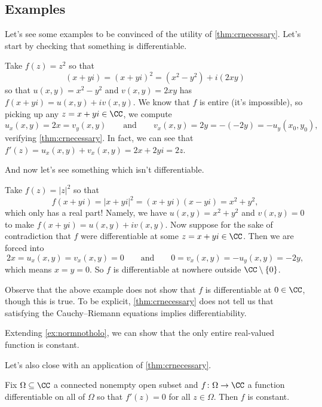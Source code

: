 \subsection{Examples}
Let's see some examples to be convinced of the utility of \autoref{thm:crnecessary}. Let's start by checking that something is differentiable.
\begin{example}
	Take $f(z)=z^2$ so that 
	\[(x+yi)=(x+yi)^2=\left(x^2-y^2\right)+i(2xy)\]
	so that $u(x,y)=x^2-y^2$ and $v(x,y)=2xy$ has $f(x+yi)=u(x,y)+iv(x,y)$. We know that $f$ is entire (it's impossible), so picking up any $z=x+yi\in\CC$, we compute
	\[u_x(x,y)=2x=v_y(x,y)\qquad\text{and}\qquad v_x(x,y)=2y=-(-2y)=-u_y(x_0,y_0),\]
	verifying \autoref{thm:crnecessary}. In fact, we can see that $f'(z)=u_x(x,y)+v_x(x,y)=2x+2yi=2z$.
\end{example}
And now let's see something which isn't differentiable.
\begin{example} \label{ex:normnotholo}
	Take $f(z)=|z|^2$ so that
	\[f(x+yi)=|x+yi|^2=(x+yi)(x-yi)=x^2+y^2,\]
	which only has a real part! Namely, we have $u(x,y)=x^2+y^2$ and $v(x,y)=0$ to make $f(x+yi)=u(x,y)+iv(x,y)$. Now suppose for the sake of contradiction that $f$ were differentiable at some $z=x+yi\in\CC$. Then we are forced into
	\[2x=u_x(x,y)=v_x(x,y)=0\qquad\text{and}\qquad0=v_x(x,y)=-u_y(x,y)=-2y,\]
	which means $x=y=0$. So $f$ is differentiable at nowhere outside $\CC\setminus\{0\}$.
\end{example}
Observe that the above example does not show that $f$ is differentiable at $0\in\CC$, though this is true. To be explicit, \autoref{thm:crnecessary} does not tell us that satisfying the Cauchy--Riemann equations implies differentiability.
\begin{remark}
	Extending \autoref{ex:normnotholo}, we can show that the only entire real-valued function is constant.
\end{remark}
Let's also close with an application of \autoref{thm:crnecessary}.
\begin{corollary} \label{cor:getconstant}
	Fix $\Omega\subseteq\CC$ a connected nonempty open subset and $f\colon \Omega\to\CC$ a function differentiable on all of $\Omega$ so that $f'(z)=0$ for all $z\in\Omega$. Then $f$ is constant.
\end{corollary}
